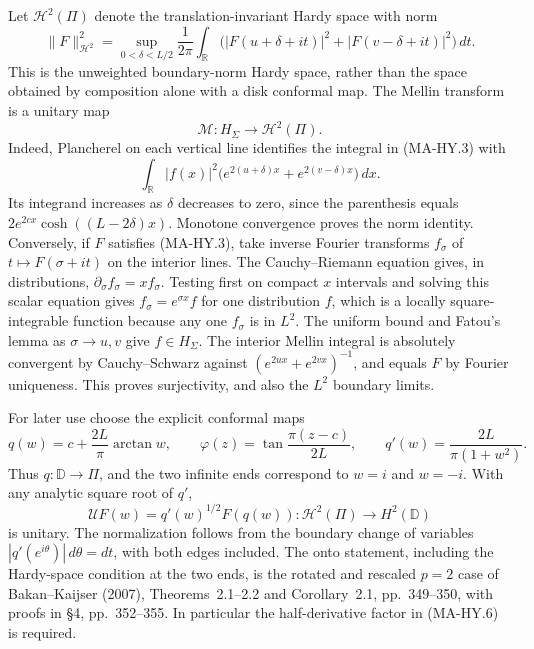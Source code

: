 Let $\mathscr H^2(\Pi)$ denote the translation-invariant Hardy space
with norm
\[
 \|F\|_{\mathscr H^2}^2
 =\sup_{0<\delta<L/2}\frac1{2\pi}\int_{\mathbb R}
       \bigl(|F(u+\delta+it)|^2+
             |F(v-\delta+it)|^2\bigr)\,dt .
 \tag{MA-HY.3}
\]
This is the unweighted boundary-norm Hardy space, rather than the
space obtained by composition alone with a disk conformal map.
The Mellin transform is a unitary map
\[
             \mathcal M:H_\Sigma\longrightarrow\mathscr H^2(\Pi).
 \tag{MA-HY.4}
\]
Indeed, Plancherel on each vertical line identifies the integral
in (MA-HY.3) with
\[
 \int_{\mathbb R}|f(x)|^2
       \bigl(e^{2(u+\delta)x}+e^{2(v-\delta)x}\bigr)\,dx .
\]
Its integrand increases as $\delta$ decreases to zero, since the
parenthesis equals $2e^{2cx}\cosh((L-2\delta)x)$.
Monotone convergence proves the norm identity.  Conversely, if
$F$ satisfies (MA-HY.3), take inverse Fourier transforms $f_\sigma$
of $t\mapsto F(\sigma+it)$ on the interior lines.  The
Cauchy--Riemann equation gives, in distributions,
$\partial_\sigma f_\sigma=x f_\sigma$.  Testing first on compact
$x$ intervals and solving this scalar equation gives
$f_\sigma=e^{\sigma x}f$ for one distribution $f$, which is a
locally square-integrable function because any one $f_\sigma$
is in $L^2$.  The uniform bound and Fatou's lemma as
$\sigma\to u,v$ give $f\in H_\Sigma$.  The interior Mellin
integral is absolutely convergent by Cauchy--Schwarz against
$(e^{2ux}+e^{2vx})^{-1}$, and equals $F$ by Fourier uniqueness.
This proves surjectivity, and also the $L^2$ boundary limits.

For later use choose the explicit conformal maps
\[
 q(w)=c+\frac{2L}{\pi}\arctan w,\qquad
 \varphi(z)=\tan\frac{\pi(z-c)}{2L},\qquad
       q'(w)=\frac{2L}{\pi(1+w^2)} .
 \tag{MA-HY.5}
\]
Thus $q:\mathbb D\to\Pi$, and the two infinite ends correspond to
$w=i$ and $w=-i$.  With any analytic square root of $q'$,
\[
     \mathcal U F(w)=q'(w)^{1/2}F(q(w))
        :\mathscr H^2(\Pi)\longrightarrow H^2(\mathbb D)
 \tag{MA-HY.6}
\]
is unitary.  The normalization follows from the boundary change
of variables $|q'(e^{i\theta})|\,d\theta=dt$, with both edges
included.  The onto statement, including the Hardy-space
condition at the two ends, is the rotated and rescaled
$p=2$ case of Bakan--Kaijser (2007), Theorems~2.1--2.2 and
Corollary~2.1, pp.~349--350, with proofs in \S4, pp.~352--355.
In particular the half-derivative factor in (MA-HY.6) is required.

